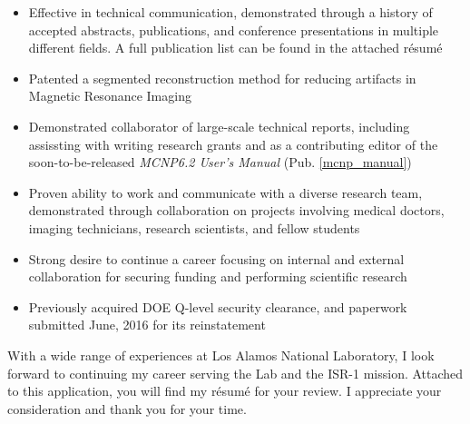 \begin{center}
\begin{minipage}{\textwidth}
\begin{itemize}[leftmargin=.15in,rightmargin=.25in,itemsep=0.8mm]
	\item Effective in technical communication, demonstrated through a history of accepted abstracts, publications, and conference presentations in multiple different fields. A full publication list can be found in the attached r\'{e}sum\'{e}
	\item Patented a segmented reconstruction method for reducing artifacts in Magnetic Resonance Imaging
	\item Demonstrated collaborator of large-scale technical reports, including assissting with writing research grants and as a contributing editor of the soon-to-be-released \textit{MCNP6.2 User's Manual} (Pub. \ref{mcnp_manual})
	
	\item Proven ability to work and communicate with a diverse research team, demonstrated through collaboration on projects involving medical doctors, imaging technicians, research scientists, and fellow students
	\item Strong desire to continue a career focusing on internal and external collaboration for securing funding and performing scientific research
		
	\item Previously acquired DOE Q-level security clearance, and paperwork submitted June, 2016 for its reinstatement
  \end{itemize} 

  \vspace{3mm}
  With a wide range of experiences at Los Alamos National Laboratory, I look forward to continuing my career serving the Lab and the ISR-1 mission.
  Attached to this application, you will find my r\'{e}sum\'{e} for your review. I appreciate your consideration and thank you for your time.
  

\end{minipage}
\end{center}
